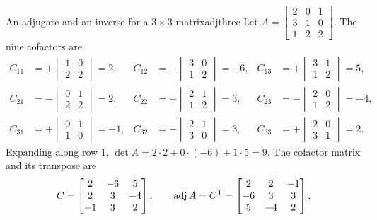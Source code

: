 \documentclass[11pt]{article}
\begin{document}
\begin{exmp}{An adjugate and an inverse for a $3\times3$ matrix}{adjthree}
Let $A=\begin{bmatrix}2&0&1\\3&1&0\\1&2&2\end{bmatrix}$. The nine cofactors are
\begin{align*}
C_{11}&=+\begin{vmatrix}1&0\\2&2\end{vmatrix}=2, & C_{12}&=-\begin{vmatrix}3&0\\1&2\end{vmatrix}=-6, & C_{13}&=+\begin{vmatrix}3&1\\1&2\end{vmatrix}=5,\\
C_{21}&=-\begin{vmatrix}0&1\\2&2\end{vmatrix}=2, & C_{22}&=+\begin{vmatrix}2&1\\1&2\end{vmatrix}=3, & C_{23}&=-\begin{vmatrix}2&0\\1&2\end{vmatrix}=-4,\\
C_{31}&=+\begin{vmatrix}0&1\\1&0\end{vmatrix}=-1, & C_{32}&=-\begin{vmatrix}2&1\\3&0\end{vmatrix}=3, & C_{33}&=+\begin{vmatrix}2&0\\3&1\end{vmatrix}=2.
\end{align*}
Expanding along row $1$, $\det A=2\cdot2+0\cdot(-6)+1\cdot5=9$. The cofactor matrix and its transpose are
\[
C=\begin{bmatrix}2&-6&5\\2&3&-4\\-1&3&2\end{bmatrix},\qquad
\operatorname{adj}A=C^{\mathsf T}=\begin{bmatrix}2&2&-1\\-6&3&3\\5&-4&2\end{bmatrix},
\]
\end{exmp}
\end{document}
